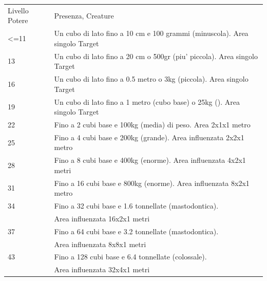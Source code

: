 \documentclass[a4paper,11pt,twoside,openany]{dndbook}
\begin{document}
\begin{tabular}[c]{@{}ll@{}}
\toprule 
Livello Potere & Presenza, Creature\tabularnewline
\textless=11 & Un cubo di lato fino a 10 cm e 100 grammi (minuscola). Area singolo
Target\tabularnewline
13 & Un cubo di lato fino a 20 cm o 500gr (piu' piccola). Area singolo Target\tabularnewline
16 & Un cubo di lato fino a 0.5 metro o 3kg (piccola). Area singolo Target\tabularnewline
19 & Un cubo di lato fino a 1 metro (cubo base) o 25kg (). Area singolo
Target\tabularnewline
22 & Fino a 2 cubi base e 100kg (media) di peso. Area 2x1x1 metro\tabularnewline
25 & Fino a 4 cubi base e 200kg (grande). Area influenzata 2x2x1 metro\tabularnewline
28 & Fino a 8 cubi base e 400kg (enorme). Area influenzata 4x2x1 metri\tabularnewline
31 & Fino a 16 cubi base e 800kg (enorme). Area influenzata 8x2x1 metro\tabularnewline
34 & Fino a 32 cubi base e 1.6 tonnellate (mastodontica).\\
&Area influenzata 16x2x1 metri\tabularnewline
37 & Fino a 64 cubi base e 3.2 tonnellate (mastodontica).\\
&Area influenzata 8x8x1 metri\tabularnewline
43 & Fino a 128 cubi base e 6.4 tonnellate (colossale).\\
&Area influenzata 32x4x1 metri\tabularnewline
\bottomrule
\end{tabular}

\bigskip
\end{document}
